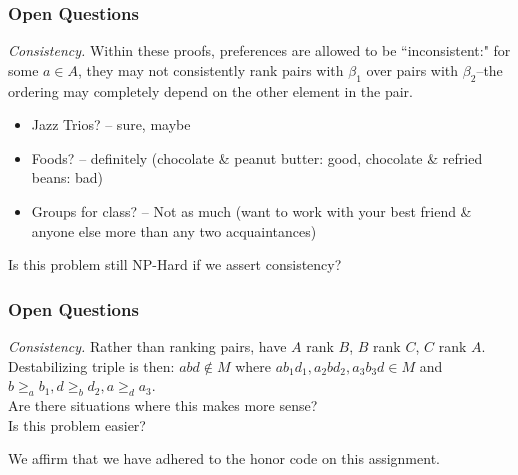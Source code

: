 \documentclass[mathserif,serif]{beamer}
\newcommand{\honor}{We affirm that we have adhered to the honor code on this assignment.}
\begin{document}
\begin{frame}

	\frametitle{Open Questions}
		
	\emph{Consistency.} Within these proofs, preferences are allowed to be ``inconsistent:" for some $a \in A$, they may not consistently rank pairs with $\beta_1$ over pairs with $\beta_2$--the ordering may completely depend on the other element in the pair. \\
	
		\begin{itemize}Does this ``make sense"/seem reasonable?\\ 
			\item Jazz Trios? -- sure, maybe\\
			\item Foods? -- definitely (chocolate \& peanut butter: good, chocolate \& refried beans: bad)\\
			\item Groups for class? -- Not as much (want to work with your best friend \& anyone else more than any two acquaintances)\\
		\end{itemize}
	\newline
	Is this problem still NP-Hard if we assert consistency?
	\newline
\end{frame}
\begin{frame}
	\frametitle{Open Questions}
	\emph{Consistency.} Rather than ranking pairs, have $A$ rank $B$, $B$ rank $C$, $C$ rank $A$.  \\
	Destabilizing triple is then: $abd \notin M$ where $a b_1 d_1, a_2 b d_2, a_3 b_3 d \in M$ and $b \geq_a b_1, d \geq_b d_2, a \geq_d a_3$.\\
	
	Are there situations where this makes more sense?\\ %
	Is this problem easier?
	 
\end{frame}

\begin{frame}
	\honor
\end{frame}
\end{document}
